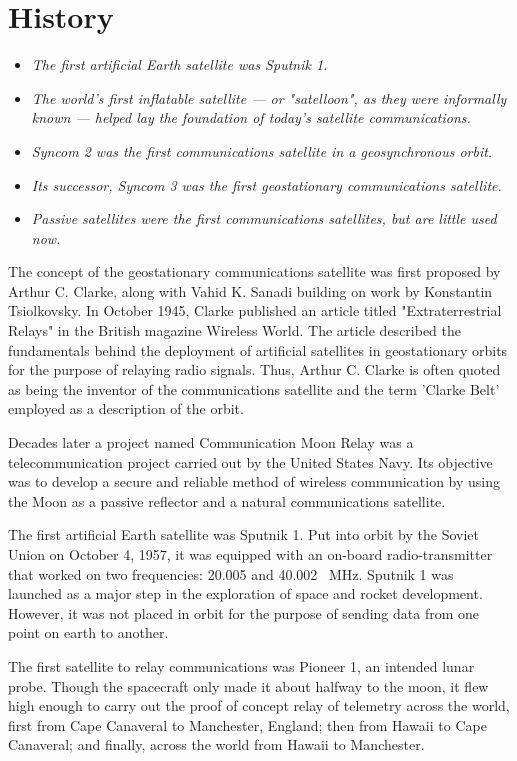 \section{History}\label{history}

\begin{itemize}
\item
  \emph{The first artificial Earth satellite was Sputnik 1.}
\item
  \emph{The world's first inflatable satellite --- or "satelloon", as
  they were informally known --- helped lay the foundation of today's
  satellite communications.}
\item
  \emph{Syncom 2 was the first communications satellite in a
  geosynchronous orbit.}
\item
  \emph{Its successor, Syncom 3 was the first geostationary
  communications satellite.}
\item
  \emph{Passive satellites were the first communications satellites, but
  are little used now.}
\end{itemize}

The concept of the geostationary communications satellite was first
proposed by Arthur C. Clarke, along with Vahid K. Sanadi building on
work by Konstantin Tsiolkovsky. In October 1945, Clarke published an
article titled "Extraterrestrial Relays" in the British magazine
Wireless World. The article described the fundamentals behind the
deployment of artificial satellites in geostationary orbits for the
purpose of relaying radio signals. Thus, Arthur C. Clarke is often
quoted as being the inventor of the communications satellite and the
term 'Clarke Belt' employed as a description of the orbit.

Decades later a project named Communication Moon Relay was a
telecommunication project carried out by the United States Navy. Its
objective was to develop a secure and reliable method of wireless
communication by using the Moon as a passive reflector and a natural
communications satellite.

The first artificial Earth satellite was Sputnik 1. Put into orbit by
the Soviet Union on October 4, 1957, it was equipped with an on-board
radio-transmitter that worked on two frequencies: 20.005 and 40.002~
MHz. Sputnik 1 was launched as a major step in the exploration of space
and rocket development. However, it was not placed in orbit for the
purpose of sending data from one point on earth to another.

The first satellite to relay communications was Pioneer 1, an intended
lunar probe. Though the spacecraft only made it about halfway to the
moon, it flew high enough to carry out the proof of concept relay of
telemetry across the world, first from Cape Canaveral to Manchester,
England; then from Hawaii to Cape Canaveral; and finally, across the
world from Hawaii to Manchester.

